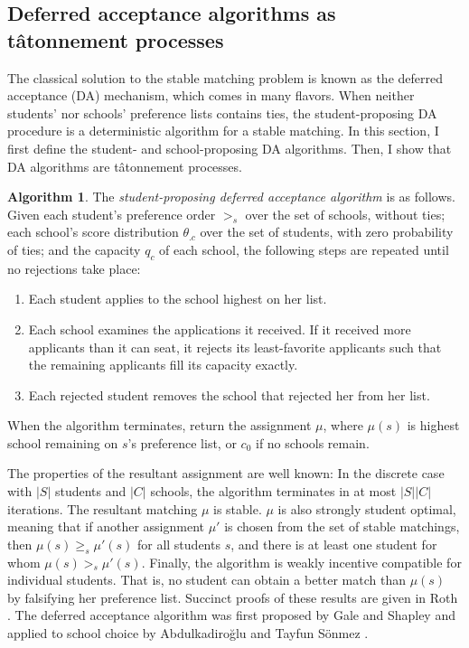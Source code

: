\documentclass[12pt]{article}
\theoremstyle{definition}
\newtheorem{algorithm}{Algorithm}
\begin{document}
\subsection{Deferred acceptance algorithms as t\^{atonnement} processes} \label{defaccaretat}
The classical solution to the stable matching problem is known as the deferred acceptance (DA) mechanism, which comes in many flavors. When neither students' nor schools' preference lists contains ties, the student-proposing DA procedure is a deterministic algorithm for a stable matching.  In this section, I first define the student- and school-proposing DA algorithms. Then, I show that DA algorithms are t\^{a}tonnement processes.

\begin{algorithm} \label{studentproposingDA}
The \emph{student-proposing deferred acceptance algorithm} is as follows. Given each student's preference order $>_s$ over the set of schools, without ties;  each school's score distribution $\theta_{.c}$ over the set of students, with zero probability of ties; and the capacity $q_c$ of each school, the following steps are repeated until no rejections take place:
\begin{enumerate}
\item Each student applies to the school highest on her list.
\item Each school examines the applications it received. If it received more applicants than it can seat, it rejects its least-favorite applicants such that the remaining applicants fill its capacity exactly.
\item Each rejected student removes the school that rejected her from her list.
\end{enumerate}
When the algorithm terminates, return the assignment $\mu$, where $\mu(s)$ is highest school remaining on $s$'s preference list, or $c_0$ if no schools remain. 
\end{algorithm}
The properties of the resultant assignment are well known: In the discrete case with $|S|$ students and $|C|$ schools, the algorithm terminates in at most $|S||C|$ iterations. The resultant matching $\mu$ is stable. $\mu$ is also strongly student optimal, meaning that if another assignment $\mu'$ is chosen from the set of stable matchings, then $\mu(s) \geq_s \mu'(s)$ for all students $s$, and there is at least one student for whom $\mu(s) >_s \mu'(s)$. Finally, the algorithm is weakly incentive compatible for individual students. That is, no student can obtain a better match than $\mu(s)$ by falsifying her preference list. Succinct proofs of these results are given in Roth \parencite*{economicsofmatching}. The deferred acceptance algorithm was first proposed by Gale and Shapley \parencite*{galeshapley1962} and applied to school choice by Abdulkadiro\u{g}lu and Tayfun S\"{o}nmez  \parencite*{schoolchoiceamechanismdesignapproach}. 
\end{document}
